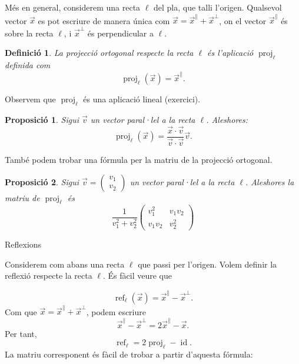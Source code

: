 \documentclass[
  11pt,
]{book}
\makeatletter
\numberwithin{dummy}{section}
\theoremstyle{maincolornumbox}
\theoremstyle{blacknumex}
\theoremstyle{blacknumbox}
\newtheorem{definitionT}{Definició}[chapter]
\theoremstyle{maincolornum}
\newtheorem{propositionT}{Proposició}[chapter]
\newenvironment{proposition}{\begin{pBox}\begin{propositionT}}{\end{propositionT}\end{pBox}}
\newenvironment{definition}{\begin{dBox}\begin{definitionT}}{\end{definitionT}\end{dBox}}
\renewcommand{\subsection}{\@startsection {subsection}{2}{\z@}
{-3ex \@plus -0.1ex \@minus -.4ex}
{0.5ex \@plus.2ex }
{\normalfont\sffamily\bfseries}}
\newlength\esp
\makeatother
\begin{document}
Més en general, considerem una recta \(\ell\) del pla, que talli l'origen.
Qualsevol vector \(\vec x\) es pot escriure de manera única com
\(\vec x = \vec x^{\parallel} + \vec x^{\perp}\), on el vector
\(\vec x^\parallel\) és sobre la recta \(\ell\), i \(\vec x^\perp\) és
perpendicular a \(\ell\).

\begin{definition}
La \emph{projecció ortogonal} respecte la recta \(\ell\) és l'aplicació
\(\operatorname{proj}_\ell\) definida com
\[\operatorname{proj}_\ell(\vec x) = \vec x^\parallel.\]
\end{definition}

Observem que \(\operatorname{proj}_\ell\) és una aplicació lineal
(exercici).

\begin{proposition}
Sigui \(\vec v\) un vector paral·lel a la recta \(\ell\). Aleshores:
\[\operatorname{proj}_\ell(\vec x) = \frac{\vec x\cdot \vec v}{\vec v\cdot \vec v} \vec v.\]
\end{proposition}

També podem trobar una fórmula per la matriu de la projecció ortogonal.

\begin{proposition}
\protect\hypertarget{prp:projR2}{}\label{prp:projR2}Sigui
\(\vec v = \begin{pmatrix}v_1\\v_2\end{pmatrix}\) un vector paral·lel a la
recta \(\ell\). Aleshores la matriu de \(\operatorname{proj}_\ell\) és
\[\frac{1}{v_1^2 + v_2^2}\begin{pmatrix}v_1^2&v_1v_2\\v_1v_2&v_2^2\end{pmatrix}\]
\end{proposition}

\hypertarget{subsubsec:reflexio}{%
\subsection{Reflexions}\label{subsubsec:reflexio}}

Considerem com abans
una recta \(\ell\) que passi per l'origen. Volem definir la reflexió
respecte la recta \(\ell\). És fàcil veure que

\[\operatorname{ref}_\ell(\vec x) = \vec x^\parallel - \vec x^\perp.\]
Com que \(\vec x = \vec x^\parallel + \vec x^\perp\), podem escriure
\[\vec x^\parallel - \vec x^\perp = 2\vec x^\parallel - \vec x.\] Per
tant,
\[\operatorname{ref}_\ell = 2\operatorname{proj}_\ell - \operatorname{id}.\]
La matriu corresponent és fàcil de trobar a partir d'aquesta fórmula:
\end{document}
